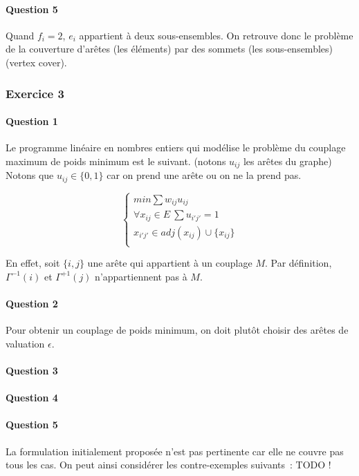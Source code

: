 \documentclass[a4paper, 12pt]{article}
\begin{document}
\paragraph{Question 5}

Quand $f_i = 2$, $e_i$ appartient à deux sous-ensembles. On retrouve
donc le problème de la couverture d'arêtes (les éléments) par des
sommets (les sous-ensembles) (vertex cover).

\subsubsection*{Exercice 3}

\paragraph{Question 1}Le programme linéaire en nombres entiers qui modélise le
  problème du couplage maximum de poids minimum est le suivant.
  (notons $u_{ij}$ les arêtes du graphe)
Notons que $u_{ij} \in \{0, 1\}$ car on prend une arête ou on ne la
prend pas.

\begin{equation}
\begin{cases}
min \sum w_{ij} u_{ij} \\
\forall x_{ij} \in E ~ \sum u_{i' j'} = 1 \\
 x_{i' j'} \in adj(x_{ij}) \cup \{ x_{ij} \} \\
\end{cases}
\end{equation}

En effet, soit $\{ i, j \}$ une arête qui appartient à un couplage
$M$. Par définition, $\Gamma^{-1}(i) $ et $\Gamma^{+1}(j)$
n'appartiennent pas à $M$.

\paragraph{Question 2}

Pour obtenir un couplage de poids minimum, on doit plutôt choisir des
arêtes de valuation $\epsilon$.

\paragraph{Question 3}
\paragraph{Question 4}
\paragraph{Question 5}
La formulation initialement proposée n'est pas pertinente car elle ne
couvre pas tous les cas. On peut ainsi considérer les contre-exemples
suivants~: TODO !
\end{document}
